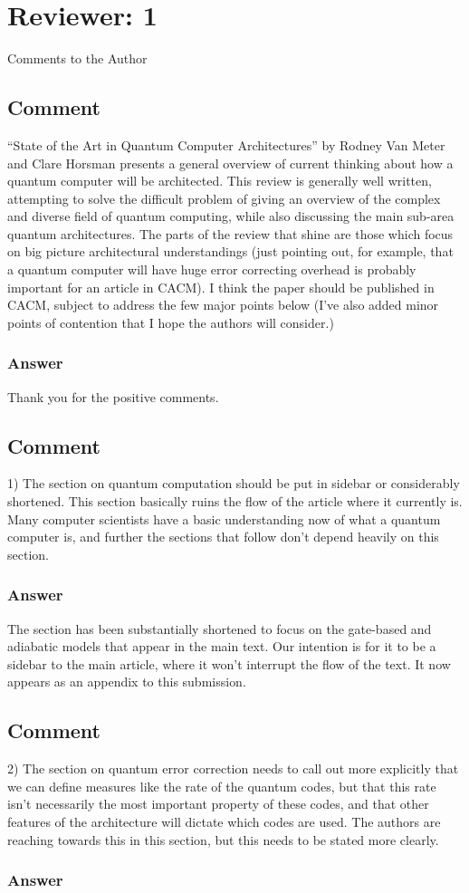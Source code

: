 \documentclass{article}
\newcommand{\comment}{\subsection{Comment}\em}
\newcommand{\answer}{\rm \subsubsection*{Answer}}
\begin{document}
\section{Reviewer: 1}

Comments to the Author
\comment

``State of the Art in Quantum Computer Architectures'' by Rodney Van
Meter and Clare Horsman presents a general overview of current
thinking about how a quantum computer will be architected.  This
review is generally well written, attempting to solve the difficult
problem of giving an overview of the complex and diverse field of
quantum computing, while also discussing the main sub-area quantum
architectures.  The parts of the review that shine are those which
focus on big picture architectural understandings (just pointing out,
for example, that a quantum computer will have huge error correcting
overhead is probably important for an article in CACM).  I think the
paper should be published in CACM, subject to address the few major
points below (I've also added minor points of contention that I hope
the authors will consider.)

\answer

Thank you for the positive comments.

\comment

1) The section on quantum computation should be put in sidebar or
considerably shortened.  This section basically ruins the flow of the
article where it currently is.  Many computer scientists have a basic
understanding now of what a quantum computer is, and further the
sections that follow don't depend heavily on this section.

\answer

The section has been substantially shortened to focus on the
gate-based and adiabatic models that appear in the main text.  Our
intention is for it to be a sidebar to the main article, where it
won't interrupt the flow of the text.  It now appears as an appendix
to this submission.

\comment

2) The section on quantum error correction needs to call out more
explicitly that we can define measures like the rate of the quantum
codes, but that this rate isn't necessarily the most important
property of these codes, and that other features of the architecture
will dictate which codes are used.  The authors are reaching towards
this in this section, but this needs to be stated more clearly.

\answer
\end{document}

